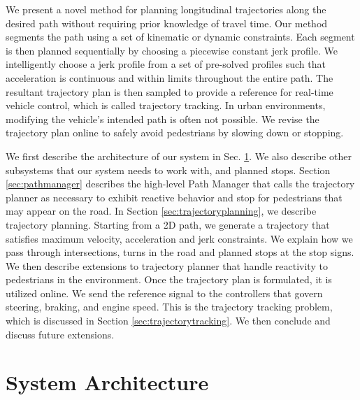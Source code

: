 \documentclass[letterpaper, 10 pt, conference]{ieeeconf}  %
\begin{document}
We present a novel method for planning longitudinal trajectories 
along the desired path without requiring prior knowledge of travel time.
Our method segments the path using a set of kinematic or dynamic constraints.
Each segment is then planned sequentially by choosing a piecewise constant jerk profile.
We intelligently choose a jerk profile from a set of pre-solved profiles such that acceleration is continuous and within limits throughout the entire path.
The resultant trajectory plan is then sampled to provide a reference for real-time vehicle control, which is called trajectory tracking. In urban environments, modifying the vehicle's intended path is often not possible. 
We revise the trajectory plan online to safely avoid pedestrians by slowing down or stopping. %

We first describe the architecture of our system in Sec. \ref{sec:systemarchirecture}.
We also describe other subsystems that our system needs to work with, and planned stops.
Section \ref{sec:pathmanager} describes the high-level Path Manager that calls the trajectory planner as necessary to 
exhibit reactive behavior and stop for pedestrians that may appear on the road.
In Section \ref{sec:trajectoryplanning}, we describe trajectory planning. Starting from a 2D path, we generate a trajectory that satisfies maximum velocity, acceleration and jerk constraints. 
We explain how we pass through intersections, turns in the road and planned stops at the stop signs.
We then describe extensions to trajectory planner that handle reactivity to pedestrians in the environment. 
Once the trajectory plan is formulated, it is utilized online. We send the reference signal to the controllers that govern steering, braking, and engine speed.
This is the trajectory tracking problem, which is discussed in Section \ref{sec:trajectorytracking}.
We then conclude and discuss future extensions.


\section{System Architecture} \label{sec:systemarchirecture}
\end{document}
